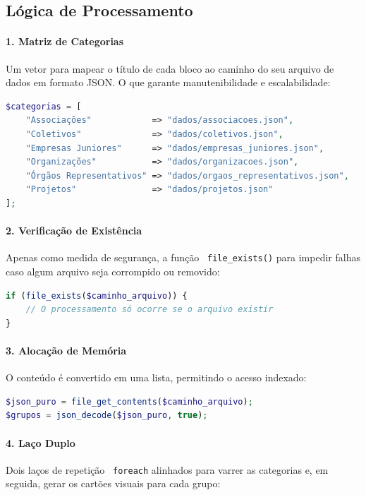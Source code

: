 \documentclass[12pt,a4paper]{article}
\begin{document}
\subsection{Lógica de Processamento}

\paragraph{1. Matriz de Categorias}
Um vetor para mapear o título de cada bloco ao caminho do seu arquivo de dados em formato JSON. O que garante manutenibilidade e escalabilidade:

\begin{lstlisting}[language=php]
$categorias = [
    "Associações"            => "dados/associacoes.json",
    "Coletivos"              => "dados/coletivos.json",
    "Empresas Juniores"      => "dados/empresas_juniores.json",
    "Organizações"           => "dados/organizacoes.json",
    "Órgãos Representativos" => "dados/orgaos_representativos.json",
    "Projetos"               => "dados/projetos.json"
];
\end{lstlisting}
    
\paragraph{2. Verificação de Existência}
Apenas como medida de segurança, a função \ \texttt{file\_exists()} para impedir falhas caso algum arquivo seja corrompido ou removido:

\begin{lstlisting}[language=php]
if (file_exists($caminho_arquivo)) {
    // O processamento só ocorre se o arquivo existir
}
\end{lstlisting}
\newpage
\paragraph{3. Alocação de Memória}
O conteúdo é convertido em uma lista, permitindo o acesso indexado:

\begin{lstlisting}[language=php]
$json_puro = file_get_contents($caminho_arquivo);
$grupos = json_decode($json_puro, true);
\end{lstlisting}
    
\paragraph{4. Laço Duplo}
Dois laços de repetição \ \texttt{foreach} alinhados para varrer as categorias e, em seguida, gerar os cartões visuais para cada grupo:
\end{document}
